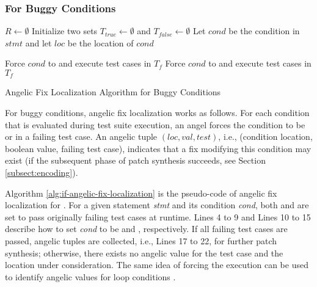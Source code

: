\subsubsection{For Buggy \ourif Conditions}

\begin{algorithm}[!t]



\BlankLine 
$R \leftarrow \emptyset$\;
Initialize two sets $T_{true} \leftarrow \emptyset$ and $T_{false} \leftarrow \emptyset$\; 
Let $cond$ be the condition in $stmt$ and let $loc$ be the location of $cond$\; 

\BlankLine 
Force $cond$ to \mytrue and execute test cases in $T_f$\; 
Force $cond$ to \myfalse and execute test cases in $T_f$\; 

\BlankLine 
{}
\BlankLine 
\caption{Angelic Fix Localization Algorithm for Buggy \ourif Conditions}
\label{alg:if-angelic-fix-localization}
\end{algorithm}

For buggy \ourif conditions, angelic fix localization works as follows.
For each \ourif condition that is evaluated during test suite execution, an angel forces the \ourif condition to be  or  in a failing test case. 
An angelic tuple $(loc, val, test)$, i.e., (\ourif condition location, boolean value, failing test case), indicates that a fix modifying this \ourif condition may exist (if the subsequent phase of patch synthesis succeeds, see Section \ref{subsect:encoding}).

Algorithm \ref{alg:if-angelic-fix-localization} is the pseudo-code of angelic fix localization for \buggyconditions. For a given \ourif statement \textit{stmt} and its condition \textit{cond}, both \mytrue and \myfalse are set to pass originally failing test cases at runtime. Lines 4 to 9 and Lines 10 to 15 describe how to set \textit{cond} to be \mytrue and \myfalse, respectively. If all failing test cases are passed, angelic tuples are collected, i.e., Lines 17 to 22, for further patch synthesis; otherwise, 
there exists no angelic value for the test case and the location under consideration.  
The same idea of forcing the execution can be used to identify angelic values for loop conditions \cite{Lamelas2015}.

